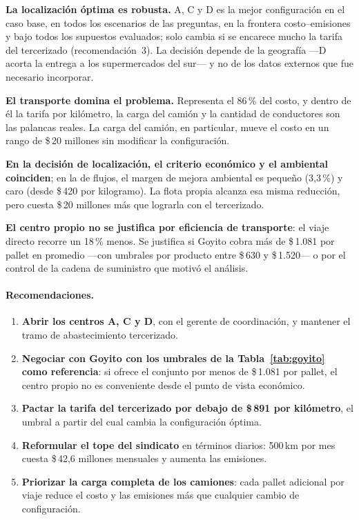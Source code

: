 \documentclass[10pt,a4paper]{article}
\begin{document}
\textbf{La localización óptima es robusta.} A, C y D es la mejor configuración
en el caso base, en todos los escenarios de las preguntas, en la frontera
costo–emisiones y bajo todos los supuestos evaluados; solo cambia si se
encarece mucho la tarifa del tercerizado (recomendación~3). La decisión
depende de la geografía —D acorta la entrega a los supermercados del sur— y no
de los datos externos que fue necesario incorporar.

\textbf{El transporte domina el problema.} Representa el 86\,\% del costo, y
dentro de él la tarifa por kilómetro, la carga del camión y la cantidad de
conductores son las palancas reales. La carga del camión, en particular, mueve
el costo en un rango de \$\,20 millones sin modificar la configuración.

\textbf{En la decisión de localización, el criterio económico y el ambiental
coinciden}; en la de flujos, el margen de mejora ambiental es pequeño
(3,3\,\%) y caro (desde \$\,420 por kilogramo). La flota propia alcanza esa
misma reducción, pero cuesta \$\,20 millones más que lograrla con el
tercerizado.

\textbf{El centro propio no se justifica por eficiencia de transporte}: el
viaje directo recorre un 18\,\% menos. Se justifica si Goyito cobra más de
\$\,1.081 por pallet en promedio —con umbrales por producto entre \$\,630 y
\$\,1.520— o por el control de la cadena de suministro que motivó el análisis.

\paragraph{Recomendaciones.}
\begin{enumerate}
  \item \textbf{Abrir los centros A, C y D}, con el gerente de coordinación, y
  mantener el tramo de abastecimiento tercerizado.
  \item \textbf{Negociar con Goyito con los umbrales de la
  Tabla~\ref{tab:goyito} como referencia}: si ofrece el conjunto por menos de
  \$\,1.081 por pallet, el centro propio no es conveniente desde el punto de
  vista económico.
  \item \textbf{Pactar la tarifa del tercerizado por debajo de \$\,891 por
  kilómetro}, el umbral a partir del cual cambia la configuración óptima.
  \item \textbf{Reformular el tope del sindicato} en términos diarios: 500\,km
  por mes cuesta \$\,42,6 millones mensuales y aumenta las emisiones.
  \item \textbf{Priorizar la carga completa de los camiones}: cada pallet
  adicional por viaje reduce el costo y las emisiones más que cualquier
  cambio de configuración.
\end{enumerate}
\end{document}
